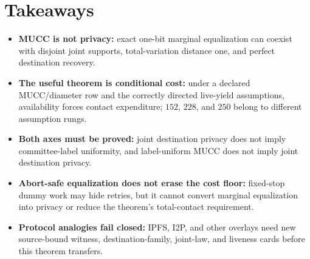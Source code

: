 \documentclass[11pt]{article}
\begin{document}
\section{Takeaways}
\begin{itemize}[leftmargin=*]
\item \textbf{MUCC is not privacy:} exact one-bit marginal equalization can coexist with disjoint joint supports, total-variation distance one, and perfect destination recovery.
\item \textbf{The useful theorem is conditional cost:} under a declared MUCC/diameter row and the correctly directed live-yield assumptions, availability forces contact expenditure; $152$, $228$, and $250$ belong to different assumption rungs.
\item \textbf{Both axes must be proved:} joint destination privacy does not imply committee-label uniformity, and label-uniform MUCC does not imply joint destination privacy.
\item \textbf{Abort-safe equalization does not erase the cost floor:} fixed-stop dummy work may hide retries, but it cannot convert marginal equalization into privacy or reduce the theorem's total-contact requirement.
\item \textbf{Protocol analogies fail closed:} IPFS, I2P, and other overlays need new source-bound witness, destination-family, joint-law, and liveness cards before this theorem transfers.
\end{itemize}
\end{document}

